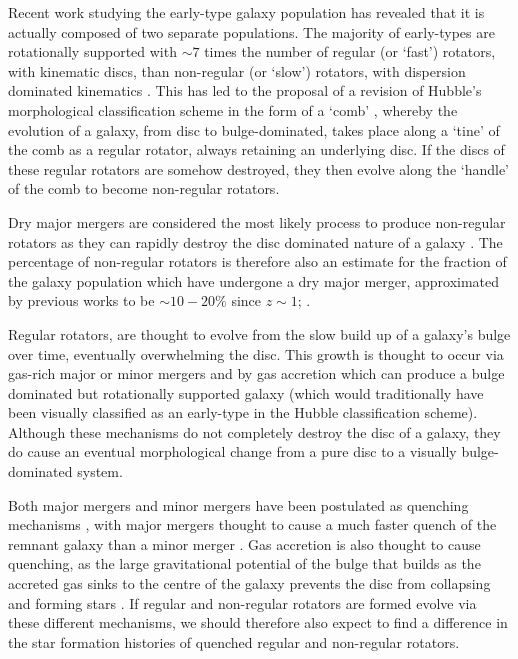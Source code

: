 \documentclass[useAMS,usenatbib]{mn2e}
\begin{document}
Recent work studying the early-type galaxy population has revealed that it is actually composed of two separate populations. The majority of early-types are rotationally supported \citep{emsellem11} with $\sim7$ times the number of regular (or `fast') rotators, with kinematic discs, than non-regular (or `slow') rotators, with dispersion dominated kinematics \citep{cappellari07, emsellem07}.  This has led to the proposal of a revision of Hubble's morphological classification scheme in the form of a `comb' \citep{cappellari16}, whereby the evolution of a galaxy, from  disc to bulge-dominated, takes place along a `tine' of the comb as a regular rotator, always retaining an underlying disc. If the discs of these regular rotators are somehow destroyed, they then evolve along the `handle' of the comb to become non-regular rotators. 

Dry major mergers are considered the most likely process to produce non-regular rotators \citep{duc11, naab14} as they can rapidly destroy the disc dominated nature of a galaxy \citep{toomre72}. The percentage of non-regular rotators is therefore also an estimate for the fraction of the galaxy population which have undergone a dry major merger, approximated by previous works to be $\sim10-20\%$ since $z\sim1$; \citep[][]{khochfar09}.

Regular rotators, are thought to evolve from the slow build up of a galaxy's bulge over time, eventually overwhelming the disc. This growth is thought to occur via gas-rich major or minor mergers \citep{duc11} and by gas accretion \citep{cappellari13, johnston14} which can produce a bulge dominated but rotationally supported galaxy (which would traditionally have been visually classified as an early-type in the Hubble classification scheme). Although these mechanisms do not completely destroy the disc of a galaxy, they do cause an eventual morphological change from a pure disc to a visually bulge-dominated system.

Both major mergers and minor mergers have been postulated as quenching mechanisms \citep{mihos94, hopkins06d, hopkins08b, hopkins08a, snyder11, hayward14}, with major mergers thought to cause a much faster quench of the remnant galaxy than a minor merger \citep{lotz08b, lotz11}. Gas accretion is also thought to cause quenching, as the large gravitational potential of the bulge that builds as the accreted gas sinks to the centre of the galaxy prevents the disc from collapsing and forming stars \citep{cheung12, fang13}. If regular and non-regular rotators are formed evolve via these different mechanisms, we should therefore also expect to find a difference in the star formation histories of quenched regular and non-regular rotators. 
\end{document}
